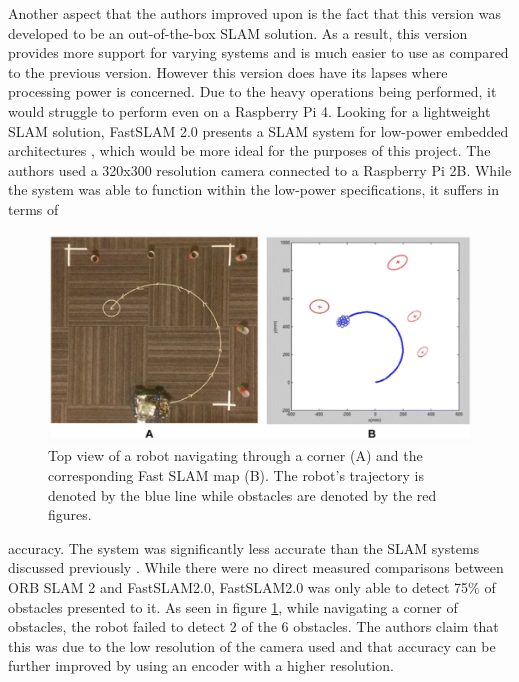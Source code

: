 \documentclass[english]{upeeei}
\begin{document}
Another aspect that the authors improved upon is the fact that this version
was developed to be an out-of-the-box SLAM solution. As a result, this version provides more support for varying systems
and is much easier to use as compared to the previous version. However this version does have its lapses where processing
power is concerned. Due to the heavy operations being performed, it would struggle to perform even on a Raspberry Pi 4. 
\newline
\newline
Looking for a lightweight SLAM solution, FastSLAM 2.0 presents a SLAM system for low-power embedded architectures \cite{FastSlam2},
which would be more ideal for the purposes of this project. The authors used a 320x300 resolution camera connected to a
Raspberry Pi 2B. While the system was able to function within the low-power specifications, it suffers in terms of
\begin{figure}[h]
    \centering
    \includegraphics[scale=0.5]{images/fastslam2.PNG}
    \caption{Top view of a robot navigating through a corner (A) and the corresponding Fast SLAM map (B). The robot's trajectory
    is denoted by the blue line while obstacles are denoted by the red figures.\cite{FastSlam2}}
    \label{fig:fastslam_results}
\end{figure}
accuracy. The system was significantly less accurate than the SLAM systems discussed previously \cite{OrbSlam1,OrbSlam2}. 
While there were no direct measured comparisons between ORB SLAM 2 and FastSLAM2.0, FastSLAM2.0 was only able to detect 
75\% of obstacles presented to it. As seen in figure \ref{fig:fastslam_results}, while navigating a corner of obstacles,
the robot failed to detect 2 of the 6 obstacles. 
The authors claim that this was due to the low resolution of the camera used and that accuracy can be further improved
by using an encoder with a higher resolution. 
\newline
\end{document}
